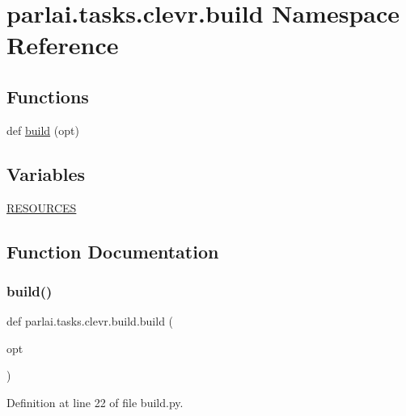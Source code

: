 \hypertarget{namespaceparlai_1_1tasks_1_1clevr_1_1build}{}\section{parlai.\+tasks.\+clevr.\+build Namespace Reference}
\label{namespaceparlai_1_1tasks_1_1clevr_1_1build}
\subsection*{Functions}
\begin{DoxyCompactItemize}
\item 
def \hyperlink{namespaceparlai_1_1tasks_1_1clevr_1_1build_a129ccb17872c5d5b1538020e5642ab91}{build} (opt)
\end{DoxyCompactItemize}
\subsection*{Variables}
\begin{DoxyCompactItemize}
\item 
\hyperlink{namespaceparlai_1_1tasks_1_1clevr_1_1build_adec962bd367c9ef6eef98ab215970488}{R\+E\+S\+O\+U\+R\+C\+ES}
\end{DoxyCompactItemize}


\subsection{Function Documentation}
\mbox{\label{namespaceparlai_1_1tasks_1_1clevr_1_1build_a129ccb17872c5d5b1538020e5642ab91}} 
\subsubsection{\texorpdfstring{build()}{build()}}
{\footnotesize\ttfamily def parlai.\+tasks.\+clevr.\+build.\+build (\begin{DoxyParamCaption}\item[{}]{opt }\end{DoxyParamCaption})}



Definition at line 22 of file build.\+py.


